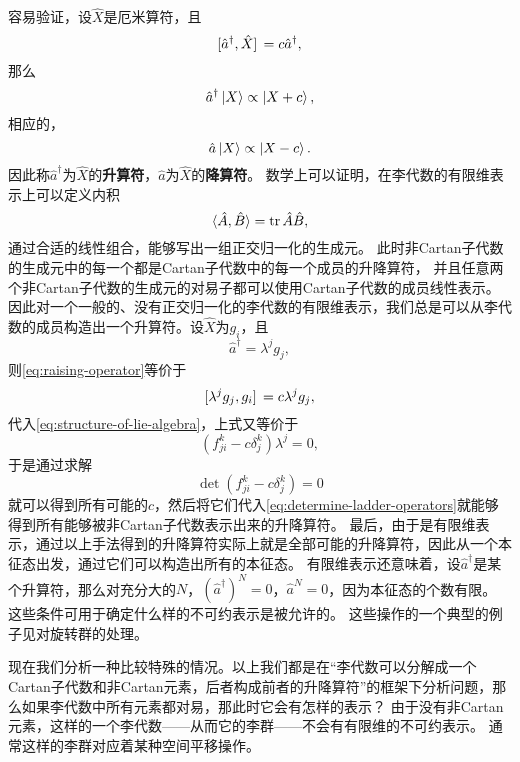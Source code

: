 \documentclass[UTF8, a4paper]{ctexart}
\begin{document}
容易验证，设$\hat{X}$是厄米算符，且
\begin{equation}
    \comm*{\hat{a}^\dagger}{\hat{X}} = c \hat{a}^\dagger,
    \label{eq:raising-operator}
\end{equation}
那么
\[
    \hat{a}^\dagger \ket{X} \propto \ket{X+c},
\]
相应的，
\[
    \hat{a} \ket{X} \propto \ket{X-c}.
\]
因此称$\hat{a}^\dagger$为$\hat{X}$的\textbf{升算符}，$\hat{a}$为$\hat{X}$的\textbf{降算符}。
数学上可以证明，在李代数的有限维表示上可以定义内积
\begin{equation}
    \langle \hat{A}, \hat{B} \rangle = \trace \hat{A} \hat{B},
\end{equation}
通过合适的线性组合，能够写出一组正交归一化的生成元。
此时非Cartan子代数的生成元中的每一个都是Cartan子代数中的每一个成员的升降算符，
并且任意两个非Cartan子代数的生成元的对易子都可以使用Cartan子代数的成员线性表示。
因此对一个一般的、没有正交归一化的李代数的有限维表示，我们总是可以从李代数的成员构造出一个升算符。设$\hat{X}$为$g_i$，且
\[
    \hat{a}^\dagger = \lambda^j g_j,
\]
则\eqref{eq:raising-operator}等价于
\[
    \comm*{\lambda^j g_j}{g_i} = c \lambda^j g_j,
\]
代入\eqref{eq:structure-of-lie-algebra}，上式又等价于
\begin{equation}
    \left( f^k_{ji} - c \delta_j^k \right) \lambda^j = 0,
    \label{eq:determine-ladder-operators}
\end{equation}
于是通过求解
\begin{equation}
    \det \left( f^k_{ji} - c \delta_j^k \right) = 0
    \label{eq:possible-c}
\end{equation}
就可以得到所有可能的$c$，然后将它们代入\eqref{eq:determine-ladder-operators}就能够得到所有能够被非Cartan子代数表示出来的升降算符。
最后，由于是有限维表示，通过以上手法得到的升降算符实际上就是全部可能的升降算符，因此从一个本征态出发，通过它们可以构造出所有的本征态。
有限维表示还意味着，设$\hat{a}^\dagger$是某个升算符，那么对充分大的$N$，$(\hat{a}^\dagger)^N = 0$，$\hat{a}^N=0$，因为本征态的个数有限。
这些条件可用于确定什么样的不可约表示是被允许的。
这些操作的一个典型的例子见对旋转群的处理。

现在我们分析一种比较特殊的情况。以上我们都是在“李代数可以分解成一个Cartan子代数和非Cartan元素，后者构成前者的升降算符”的框架下分析问题，那么如果李代数中所有元素都对易，那此时它会有怎样的表示？
由于没有非Cartan元素，这样的一个李代数——从而它的李群——不会有有限维的不可约表示。
通常这样的李群对应着某种空间平移操作。
\end{document}
